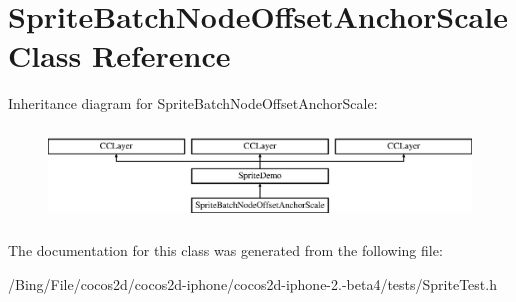 \hypertarget{interface_sprite_batch_node_offset_anchor_scale}{\section{Sprite\-Batch\-Node\-Offset\-Anchor\-Scale Class Reference}
\label{interface_sprite_batch_node_offset_anchor_scale}
}
Inheritance diagram for Sprite\-Batch\-Node\-Offset\-Anchor\-Scale\-:\begin{figure}[H]
\begin{center}
\leavevmode
\includegraphics[height=2.511211cm]{interface_sprite_batch_node_offset_anchor_scale}
\end{center}
\end{figure}


The documentation for this class was generated from the following file\-:\begin{DoxyCompactItemize}
\item 
/\-Bing/\-File/cocos2d/cocos2d-\/iphone/cocos2d-\/iphone-\/2.-\/beta4/tests/Sprite\-Test.\-h\end{DoxyCompactItemize}
